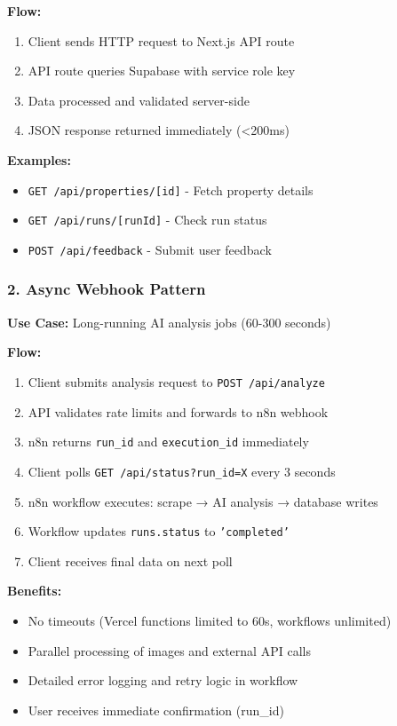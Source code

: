 \documentclass[11pt,a4paper]{article}
\begin{document}
\textbf{Flow:}
\begin{enumerate}
  \item Client sends HTTP request to Next.js API route
  \item API route queries Supabase with service role key
  \item Data processed and validated server-side
  \item JSON response returned immediately (\textless 200ms)
\end{enumerate}

\textbf{Examples:}
\begin{itemize}
  \item \texttt{GET /api/properties/[id]} - Fetch property details
  \item \texttt{GET /api/runs/[runId]} - Check run status
  \item \texttt{POST /api/feedback} - Submit user feedback
\end{itemize}

\subsubsection{2. Async Webhook Pattern}

\textbf{Use Case:} Long-running AI analysis jobs (60-300 seconds)

\textbf{Flow:}
\begin{enumerate}
  \item Client submits analysis request to \texttt{POST /api/analyze}
  \item API validates rate limits and forwards to n8n webhook
  \item n8n returns \texttt{run\_id} and \texttt{execution\_id} immediately
  \item Client polls \texttt{GET /api/status?run\_id=X} every 3 seconds
  \item n8n workflow executes: scrape → AI analysis → database writes
  \item Workflow updates \texttt{runs.status} to \texttt{'completed'}
  \item Client receives final data on next poll
\end{enumerate}

\textbf{Benefits:}
\begin{itemize}
  \item No timeouts (Vercel functions limited to 60s, workflows unlimited)
  \item Parallel processing of images and external API calls
  \item Detailed error logging and retry logic in workflow
  \item User receives immediate confirmation (run\_id)
\end{itemize}
\end{document}
